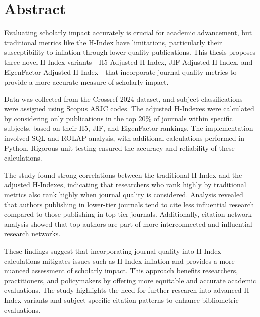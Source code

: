 \chapter*{\centering Abstract}
Evaluating scholarly impact accurately is crucial for academic advancement, but traditional metrics 
like the H-Index have limitations, particularly their susceptibility to inflation through 
lower-quality publications.  This thesis proposes three novel H-Index variants—H5-Adjusted H-Index,
JIF-Adjusted H-Index, and EigenFactor-Adjusted H-Index—that incorporate journal quality metrics to
provide a more accurate measure of scholarly impact.

Data was collected from the Crossref-2024 dataset, and subject classifications were assigned 
using Scopus ASJC codes. The adjusted H-Indexes were calculated by considering only publications 
in the top 20\% of journals within specific subjects, based on their H5, JIF, and EigenFactor 
rankings. The implementation involved SQL and ROLAP analysis, with additional calculations performed 
in Python. Rigorous unit testing ensured the accuracy and reliability of these calculations.

The study found strong correlations between the traditional H-Index and the adjusted H-Indexes, 
indicating that researchers who rank highly by traditional metrics also rank highly when journal 
quality is considered. Analysis revealed that authors publishing in lower-tier journals tend to 
cite less influential research compared to those publishing in top-tier journals. Additionally, 
citation network analysis showed that top authors are part of more interconnected and influential 
research networks.

These findings suggest that incorporating journal quality into H-Index calculations mitigates 
issues such as H-Index inflation and provides a more nuanced assessment of scholarly impact. 
This approach benefits researchers, practitioners, and policymakers by offering more equitable 
and accurate academic evaluations. The study highlights the need for further research into 
advanced H-Index variants and subject-specific citation patterns to enhance bibliometric evaluations.
